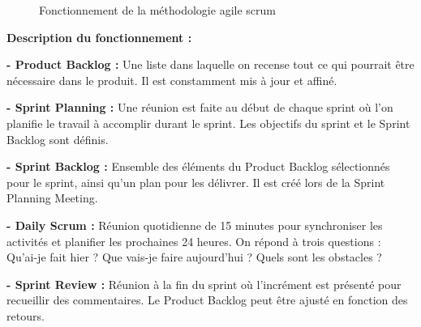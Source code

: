 	\begin{figure}[H]%
    \center%
    \setlength{\fboxsep}{5pt}%
    \setlength{\fboxrule}{0.5pt}%
    \caption{Fonctionnement de la méthodologie agile scrum}%
\end{figure}

\textbf{Description du fonctionnement :}

\textbf{- Product Backlog :} Une liste dans laquelle on recense tout ce qui pourrait être nécessaire dans le produit. Il est constamment mis à jour et affiné.

\textbf{- Sprint Planning :} Une réunion est faite au début de chaque sprint où l'on planifie le travail à accomplir durant le sprint. Les objectifs du sprint et le Sprint Backlog sont définis.\par

 \textbf{- Sprint Backlog :} Ensemble des éléments du Product Backlog sélectionnés pour le sprint, ainsi qu'un plan pour les délivrer. Il est créé lors de la Sprint Planning Meeting. 
 \par

\textbf{- Daily Scrum :} Réunion quotidienne de 15 minutes pour synchroniser les activités et planifier les prochaines 24 heures. On répond à trois questions : Qu'ai-je fait hier ? Que vais-je faire aujourd'hui ? Quels sont les obstacles ?
 \par 
 
\textbf{- Sprint Review :} Réunion à la fin du sprint où l'incrément est présenté pour recueillir des commentaires. Le Product Backlog peut être ajusté en fonction des retours.
 \par  
 
